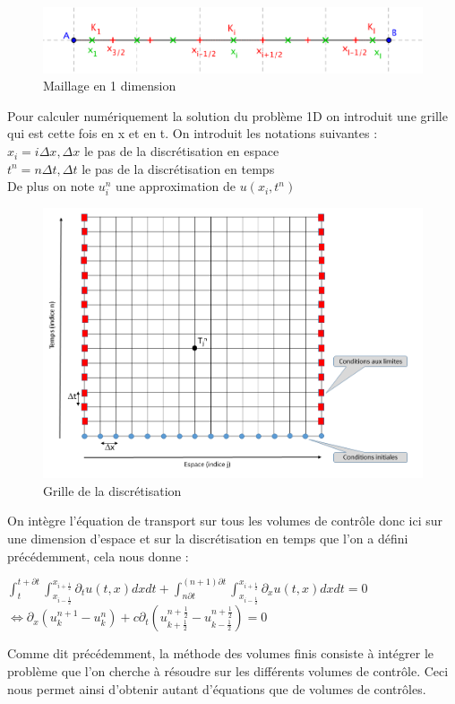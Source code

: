 \documentclass[12pt]{article}
\begin{document}
    \begin{figure}[H]
	\centering
	\includegraphics[scale=0.4]{VF2.png}
	\caption{Maillage en 1 dimension}
	\label{1D}
	\end{figure}
\noindent Pour calculer numériquement la solution du problème 1D on introduit une grille qui est cette fois en x et en t.
\noindent On introduit les notations suivantes :
\\
 $x_i=i\Delta x, \Delta x$ le pas de la discrétisation en espace
\\
$ t^n=n\Delta t, \Delta t$ le pas de la discrétisation en temps
\\De plus on note $u_i^n$ une approximation de $u(x_i,t^n)$
 \begin{figure}[H]
	\centering
	\includegraphics[scale=0.3]{DFGrille.PNG}
	\caption{Grille de la discrétisation}
	\label{1D}
	\end{figure}
\noindent On intègre l’équation de transport sur tous les volumes de contrôle donc ici sur une dimension d'espace et sur la discrétisation en temps que l'on a défini précédemment, cela nous donne :

\begin{center}
      $ \displaystyle \int_{t}^{t+\partial t}\int_{x_{i-\frac{1}{2}}}^{x_{i+\frac{1}{2}}}\partial_tu(t,x) dxdt + \int_{n\partial t}^{(n+1)\partial t}\int_{x_{i-\frac{1}{2}}}^{x_{i+\frac{1}{2}}} \partial_xu(t,x) dxdt =0$
      \\$\Leftrightarrow \displaystyle \partial_x (u_k^{n+1} -u_k^n) + c\partial_t \left(u_{k+\frac{1}{2}}^{n+\frac{1}{2}}-u_{k-\frac{1}{2}}^{n+\frac{1}{2}}\right)=0$
\end{center}
\noindent Comme dit précédemment, la méthode des volumes finis consiste à intégrer le problème que l'on cherche à résoudre sur les différents volumes de contrôle. Ceci nous permet ainsi d'obtenir autant d'équations que de volumes de contrôles. 
\end{document}
